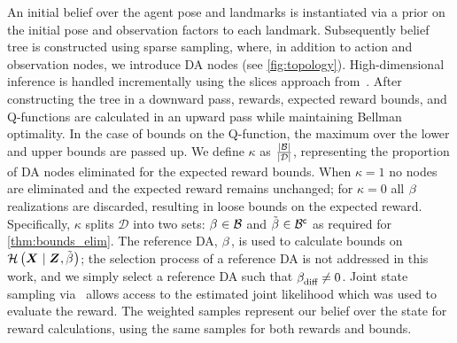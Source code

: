 An initial belief over the agent pose and landmarks is instantiated via a prior on the initial pose and observation factors to each landmark. Subsequently belief tree is constructed using sparse sampling, where, in addition to action and observation nodes, we introduce DA nodes (see \cref{fig:topology}). High-dimensional inference is handled incrementally using the slices approach from~\cite{Shienman24arxiv}. After constructing the tree in a downward pass, rewards, expected reward bounds, and Q-functions are calculated in an upward pass while maintaining Bellman optimality. In the case of bounds on the Q-function, the maximum over the lower and upper bounds are passed up. We define $\kappa$ as $\frac{\lvert\mathcal B\rvert}{\lvert\mathcal{D}\rvert}$, representing the proportion of DA nodes eliminated for the expected reward bounds.  When $\kappa=1$ no nodes are eliminated and the expected reward remains unchanged; for $\kappa=0$ all $\beta_{}^{}$ realizations are discarded, resulting in loose bounds on the expected reward. Specifically, $\kappa$ splits $\mathcal{D}$ into two sets: $\beta_{}^{}\in\mathcal B$ and $\tilde{\beta_{}^{}}\in{\ensuremath{\mathcal B}}^{\mathsf{c}}$ as required for \cref{thm:bounds_elim}. The reference DA, $\beta_{}^{}$, is used to calculate bounds on $\mathcal{H}\left({\boldsymbol X_{}}\mid{\ensuremath{\boldsymbol Z_{}},\tilde{\ensuremath{\beta_{}^{}}}}\right)$; the selection process of a reference DA is not addressed in this work, and we simply select a reference DA such that $\beta_{\textup{diff}}^{}\neq0$. Joint state sampling via~\cite{Shienman24arxiv} allows access to the estimated joint likelihood which was used to evaluate the reward. The weighted samples represent our belief over the state for reward calculations, using the same samples for both rewards and bounds.

